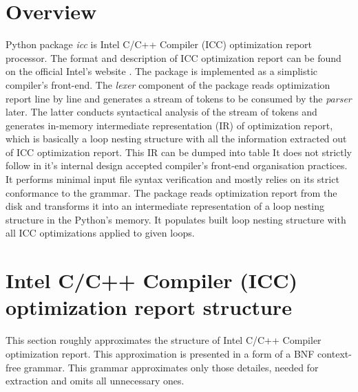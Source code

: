 \section{Overview}
\qquad Python package \textit{icc} is Intel C/C++ Compiler (ICC) optimization report processor. The format and description of ICC optimization report can be found on the official Intel's website \cite{icc-optimization-reports}. The package is implemented as a simplistic compiler's front-end. The \textit{lexer} component of the package reads optimization report line by line and generates a stream of tokens to be consumed by the \textit{parser} later. The latter conducts syntactical analysis of the stream of tokens and generates in-memory intermediate representation (IR) of optimization report, which is basically a loop nesting structure with all the information extracted out of ICC optimization report. This IR can be dumped into table \newline\null
\qquad It does not strictly follow in it's internal design accepted compiler's front-end organisation practices. It performs minimal input file syntax verification and mostly relies on its strict conformance to the grammar. The package reads optimization report from the disk and transforms it into an intermediate representation of a loop nesting structure in the Python's memory. It populates built loop nesting structure with all ICC optimizations \cite{bacon} applied to given loops.    

\section{Intel C/C++ Compiler (ICC) optimization report structure}
\qquad This section roughly approximates the structure of Intel C/C++ Compiler optimization report. This approximation is presented in a form of a BNF context-free grammar. This grammar approximates only those detailes, needed for extraction and omits all unnecessary ones.   

